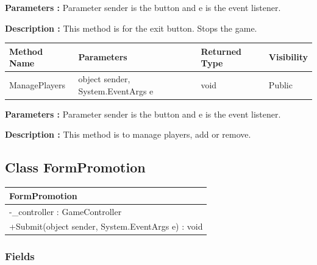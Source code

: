 \documentclass[12pt]{article}
\begin{document}
    \textbf{Parameters :} Parameter sender is the button and e is the event listener.

    \textbf{Description :} This method is for the exit button. Stops the game.

    \begin{table}[H]
        \begin{tabular}{|l|l|l|l|}
            \hline
            \rowcolor[HTML]{EFEFEF}
            \cellcolor[HTML]{EFEFEF}\textbf{Method Name} & \textbf{Parameters}               & \textbf{Returned Type} & \textbf{Visibility} \\ \hline
            ManagePlayers                                & object sender, System.EventArgs e & void                   & Public              \\ \hline
        \end{tabular}
    \end{table}

    \textbf{Parameters :} Parameter sender is the button and e is the event listener.

    \textbf{Description :} This method is to manage players, add or remove.

    \newpage


    \subsection{Class FormPromotion}

    \begin{table}[H]
        \begin{tabular}{|l|}
            \hline
            \rowcolor[HTML]{C0C0C0}
            \textbf{FormPromotion}                            \\ \hline
            \rowcolor[HTML]{EFEFEF}
            -\_controller : GameController                    \\ \hline
            \rowcolor[HTML]{FFFFFF}
            +Submit(object sender, System.EventArgs e) : void \\ \hline
        \end{tabular}
    \end{table}

    \subsubsection{Fields}
\end{document}

